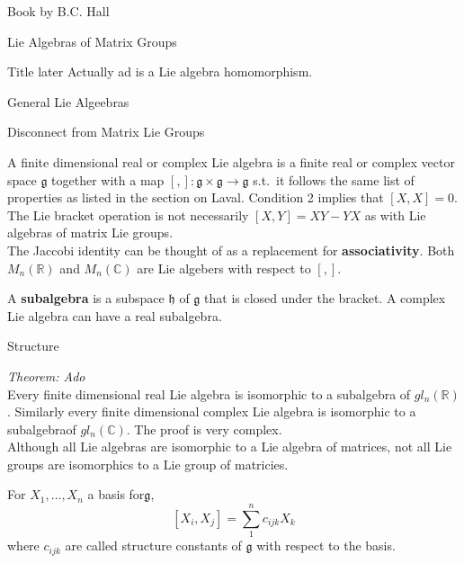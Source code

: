 \documentclass[12pt, letterpaper]{article}
\newcommand{\R}{\mathbb{R}}
\newcommand{\C}{\mathbb{C}}
\begin{document}
\begin{section}{Book by B.C. Hall}
\begin{subsection}{Lie Algebras of Matrix Groups}
\begin{subsubsection}{Title later}
      Actually ad is a Lie algebra homomorphism.

    \end{subsubsection}

  \end{subsection}

  \begin{subsection}{General Lie Algeebras}

    \begin{subsubsection}{Disconnect from Matrix Lie Groups}

      A finite dimensional real or complex Lie algebra is a finite real or
      complex vector space \(\mathfrak{g}\) together with a map
      \([,]: \mathfrak{g} \times \mathfrak{g} \to \mathfrak{g}\) s.t.\ it
      follows the same list of properties as listed in the section on Laval.
      Condition 2 implies that \([X, X] = 0\). The Lie bracket operation is not
      necessarily \([X, Y] = XY - YX\) as with Lie algebras of matrix Lie
      groups. \\
      The Jaccobi identity can be thought of as a replacement for
      \textbf{associativity}. Both \(M_{n}(\R)\) and \(M_{n}(\C)\) are Lie
      algebers with respect to \([,]\).

      A \textbf{subalgebra} is a subspace \(\mathfrak{h}\) of \(\mathfrak{g}\)
      that is closed under the bracket. A complex Lie algebra can have a real
      subalgebra.

    \end{subsubsection}

    \begin{subsubsection}{Structure}

      \emph{Theorem: Ado} \\
      Every finite dimensional real Lie algebra is isomorphic to a subalgebra of
      \(gl_{n}(\R)\). Similarly every finite dimensional complex Lie algebra is
      isomorphic to a subalgebraof \(gl_{n}(\C)\). The proof is very complex. \\
      Although all Lie algebras are isomorphic to a Lie algebra of matrices, not
      all Lie groups are isomorphics to a Lie group of matricies.

      For \(X_{1}, \dots, X_{n}\) a basis for\(\mathfrak{g}\), \[[X_{i}, X_{j}]
        = \sum^{n}_{1} c_{ijk} X_{k}\] where \(c_{ijk}\) are called structure
      constants of \(\mathfrak{g}\) with respect to the basis.

    \end{subsubsection}


\end{subsection}
\end{section}
\end{document}
